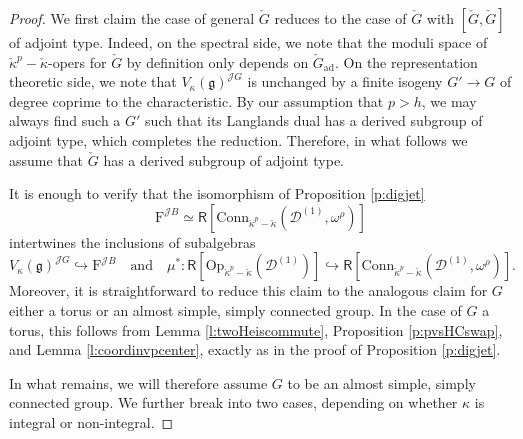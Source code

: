 \documentclass{amsart}
\theoremstyle{definition}
\newcommand{\diglet}{\mathrm{F}}
\newcommand{\fg}{\mathfrak{g}}
\newcommand{\fr}{^\on{(1)}}
\newcommand{\sD}{\mathscr{D}}
\newcommand{\on}{\mathrm}
\newcommand{\Ring}{\mathsf{R}}
\newcommand{\Jet}{\mathscr{J}}
\newcommand{\ckappa}{\check{\kappa}}
\newcommand{\Conn}{\on{Conn}}
\numberwithin{equation}{section}
\begin{document}
\begin{proof} { We first claim the case of general $\check{G}$ reduces to the case of $\check{G}$ with $[\check{G}, \check{G}]$ of adjoint type. Indeed, on the spectral side, we note that the moduli space of $\ckappa^p - \ckappa$-opers for $\check{G}$ by definition only depends on $\check{G}_{\on{ad}}$. On the representation theoretic side, we note that $V_\kappa(\fg)^{\Jet G}$ is unchanged by a finite  isogeny $G' \rightarrow G$ of degree coprime to the characteristic. By our assumption that $p > h$, we may always find such a $G'$ such that its Langlands dual has a derived subgroup of adjoint type, which completes the reduction. Therefore, in what follows we assume that $\check{G}$ has a derived subgroup of adjoint type.}







It is enough to verify that the isomorphism of Proposition \ref{p:digjet}$$\diglet^{\Jet B} \simeq \Ring[\Conn_{\ckappa^p - \ckappa}(\sD\fr, \omega^\rho)]$$intertwines the inclusions of subalgebras 
$$V_\kappa(\fg)^{\Jet G} \hookrightarrow \diglet^{\Jet B} \quad \text{and} \quad \mu^*: \Ring[\on{Op}_{\ckappa^p - \ckappa}(\sD\fr)] \hookrightarrow \Ring[\Conn_{\ckappa^p - \ckappa}(\sD\fr, \omega^\rho)].$$
Moreover, it is straightforward to reduce this claim to the analogous claim for $G$ either a torus or an almost simple, simply connected group. In the case of $G$ a torus, this follows from Lemma \ref{l:twoHeiscommute}, Proposition \ref{p:pvsHCswap}, and Lemma \ref{l:coordinvpcenter}, exactly as in the proof of Proposition \ref{p:digjet}. 

In what remains, we will therefore assume $G$ to be an almost simple, simply connected group. We further break into two cases, depending on whether $\kappa$ is integral or non-integral. 


\end{proof}
\end{document}
